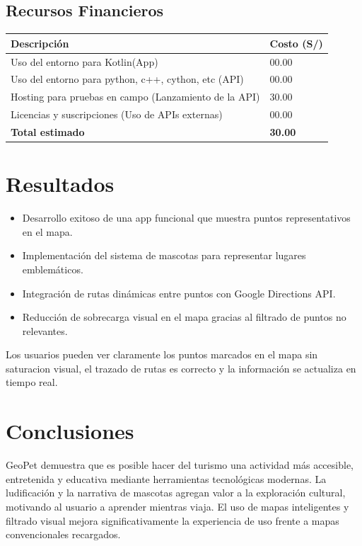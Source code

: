 \documentclass[12pt]{article}
\begin{document}
\subsection{Recursos Financieros}

\begin{longtable}{|p{8cm}|p{3cm}|}
\hline
\textbf{Descripción} & \textbf{Costo (S/)} \\
\hline
Uso del entorno para Kotlin(App) & 00.00 \\
Uso del entorno para python, c++, cython, etc (API) & 00.00 \\
Hosting para pruebas en campo (Lanzamiento de la API) & 30.00 \\
Licencias y suscripciones (Uso de APIs externas) & 00.00 \\
\hline
\textbf{Total estimado} & \textbf{30.00} \\
\hline
\end{longtable}

\section{Resultados}

\begin{itemize}
    \item Desarrollo exitoso de una app funcional que muestra puntos representativos en el mapa.
    \item Implementación del sistema de mascotas para representar lugares emblemáticos.
    \item Integración de rutas dinámicas entre puntos con Google Directions API.
    \item Reducción de sobrecarga visual en el mapa gracias al filtrado de puntos no relevantes.
\end{itemize}

Los usuarios pueden ver claramente los puntos marcados en el mapa sin saturacion visual, el trazado de rutas es correcto y la información se actualiza en tiempo real.
\section{Conclusiones}

GeoPet demuestra que es posible hacer del turismo una actividad más accesible, entretenida y educativa mediante herramientas tecnológicas modernas. La ludificación y la narrativa de mascotas agregan valor a la exploración cultural, motivando al usuario a aprender mientras viaja. El uso de mapas inteligentes y filtrado visual mejora significativamente la experiencia de uso frente a mapas convencionales recargados.
\end{document}
